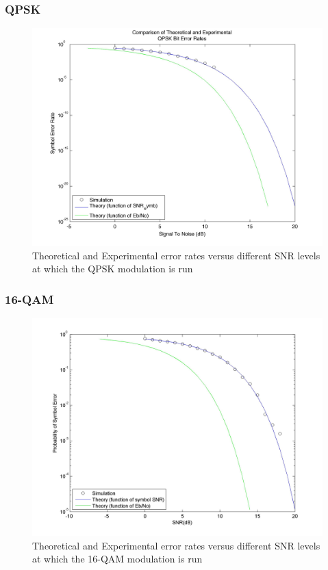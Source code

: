\documentclass[]{article}
\begin{document}
\subsubsection{QPSK}
\begin{figure}[H]
\centering
\hspace*{-2cm}\includegraphics[width=1.3\textwidth]{qpSNR.jpg}
\caption{Theoretical and Experimental error rates versus different SNR levels at which the QPSK modulation is run }
\end{figure}
\subsubsection{16-QAM}
\begin{figure}[H]
\centering
\hspace*{-2cm}\includegraphics[width=1.3\textwidth]{qam16SNR.jpg}
\caption{Theoretical and Experimental error rates versus different SNR levels at which the 16-QAM modulation is run }
\end{figure}
\end{document}
